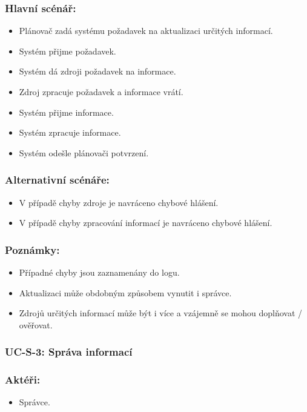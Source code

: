 \subsubsection*{Hlavní scénář:}
\begin{itemize}
 \item Plánovač zadá systému požadavek na aktualizaci určitých informací.
 \item Systém přijme požadavek.
 \item Systém dá zdroji požadavek na informace.
 \item Zdroj zpracuje požadavek a informace vrátí.
 \item Systém přijme informace.
 \item Systém zpracuje informace.
 \item Systém odešle plánovači potvrzení.
\end{itemize}
\subsubsection*{Alternativní scénáře:}
\begin{itemize}
 \item V případě chyby zdroje je navráceno chybové hlášení.
 \item V případě chyby zpracování informací je navráceno chybové hlášení.
\end{itemize}
\subsubsection*{Poznámky:}
\begin{itemize}
 \item Případné chyby jsou zaznamenány do logu.
 \item Aktualizaci může obdobným způsobem vynutit i správce.
 \item Zdrojů určitých informací může být i více a vzájemně se mohou doplňovat / ověřovat.
\end{itemize}

\subsubsection{UC-S-3: Správa informací}
\subsubsection*{Aktéři:}
\begin{itemize}
 \item Správce.
\end{itemize}
